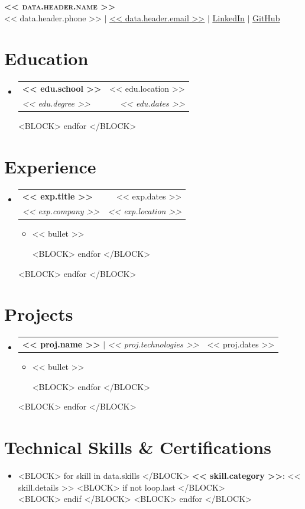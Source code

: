 \documentclass[letterpaper,9.8pt]{article}
\makeatletter
\newcommand{\resumeItem}[1]{
  \item\small{
    {#1 \vspace{-3pt}}
  }
}
\newcommand{\resumeSubheading}[4]{
  \vspace{-1pt}\item
    \begin{tabular*}{0.97\textwidth}[t]{l@{\extracolsep{\fill}}r}
      \textbf{#1} & #2 \\
      \textit{\small#3} & \textit{\small #4} \\
    \end{tabular*}\vspace{-6pt}
}
\newcommand{\resumeProjectHeading}[2]{
    \item
    \begin{tabular*}{0.97\textwidth}{l@{\extracolsep{\fill}}r}
      \small#1 & #2 \\
    \end{tabular*}\vspace{-6pt}
}
\newcommand{\resumeItemListStart}{\begin{itemize}[leftmargin=*, label=$\bullet$]}
\newcommand{\resumeItemListEnd}{\end{itemize}\vspace{-5pt}}
\newcommand{\resumeSubHeadingListStart}{\begin{itemize}[leftmargin=0.15in, label={}]}
\newcommand{\resumeSubHeadingListEnd}{\end{itemize}}
\makeatother
\begin{document}
\begin{center}
    \textbf{\Huge \scshape << data.header.name >>} \\ \vspace{1pt}
    \small << data.header.phone >> $|$ \href{mailto:<< data.header.email >>}{\underline{<< data.header.email >>}} $|$ 
    \href{<< data.header.linkedin >>}{\underline{LinkedIn}} $|$
    \href{<< data.header.github >>}{\underline{GitHub}}
\end{center}


\section{Education}
  \resumeSubHeadingListStart
  <BLOCK> for edu in data.education </BLOCK>
    \resumeSubheading
      {<< edu.school >>}{<< edu.location >>}
      {<< edu.degree >>}{<< edu.dates >>}
  <BLOCK> endfor </BLOCK>
  \resumeSubHeadingListEnd


\section{Experience}
  \resumeSubHeadingListStart
  <BLOCK> for exp in data.experience </BLOCK>
    \resumeSubheading
      {<< exp.title >>}{<< exp.dates >>}
      {<< exp.company >>}{<< exp.location >>}
      \resumeItemListStart
        <BLOCK> for bullet in exp.bullets </BLOCK>
        \resumeItem{<< bullet >>}
        <BLOCK> endfor </BLOCK>
      \resumeItemListEnd
  <BLOCK> endfor </BLOCK>
  \resumeSubHeadingListEnd


\section{Projects}
    \resumeSubHeadingListStart
    <BLOCK> for proj in data.projects </BLOCK>
      \resumeProjectHeading
          {\textbf{<< proj.name >>} $|$ \emph{<< proj.technologies >>}}{<< proj.dates >>}
          \resumeItemListStart
            <BLOCK> for bullet in proj.bullets </BLOCK>
            \resumeItem{<< bullet >>}
            <BLOCK> endfor </BLOCK>
          \resumeItemListEnd
    <BLOCK> endfor </BLOCK>
    \resumeSubHeadingListEnd

\section{Technical Skills \& Certifications}
 \begin{itemize}[leftmargin=0.15in, label={}]
    \item {\small
    <BLOCK> for skill in data.skills </BLOCK>
     \textbf{<< skill.category >>}{: << skill.details >>} <BLOCK> if not loop.last </BLOCK> \\ <BLOCK> endif </BLOCK>
    <BLOCK> endfor </BLOCK>
    }
 \end{itemize}

\end{document}
